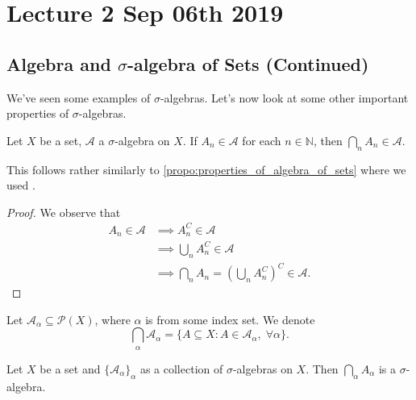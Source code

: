 \documentclass[notoc,notitlepage]{tufte-book}
\begin{document}


\chapter{Lecture 2 Sep 06th 2019}%
\label{chp:lecture_2_sep_06th_2019}

\section{Algebra and \texorpdfstring{$\sigma$}{Sigma}-algebra of Sets (Continued)}%
\label{sec:algebra_and_sigma_algebra_of_sets_continued}

We've seen some examples of $\sigma$-algebras.
Let's now look at some other important properties of $\sigma$-algebras.

\begin{propo}\label{propo:closure_of_sigma_algebras_under_countable_intersection}
  Let $X$ be a set, $\mathcal{A}$ a $\sigma$-algebra on $X$.
  If $A_n \in \mathcal{A}$ for each $n \in \mathbb{N}$,
  then $\bigcap_{n} A_n \in \mathcal{A}$.
\end{propo}

This follows rather similarly to \cref{propo:properties_of_algebra_of_sets}
where we used .

\begin{proof}
  We observe that
  \begin{align*}
    A_n \in \mathcal{A}
    &\implies A_n^C \in \mathcal{A} \\
    &\implies \bigcup_{n} A_n^C \in \mathcal{A} \\
    &\implies \bigcap_{n} A_n = \left( \bigcup_{n} A_n^C \right)^C \in \mathcal{A}.
  \end{align*}
\end{proof}

Let $\mathcal{A}_\alpha \subseteq \mathcal{P}(X)$,
where $\alpha$ is from some index set.
We denote
\begin{equation*}
  \bigcap_{\alpha} \mathcal{A}_\alpha = \{ A \subseteq X
    : A \in \mathcal{A}_\alpha,\; \forall \alpha \}.
\end{equation*}

\begin{propo}\label{propo:existence_of_the_smallest_sigma_algebra_on_a_set}
  Let $X$ be a set and $\{\mathcal{A}_\alpha\}_\alpha$ as
  a collection of $\sigma$-algebras on $X$.
  Then $\bigcap_{\alpha} A_\alpha$ is a $\sigma$-algebra.
\end{propo}
\end{document}

